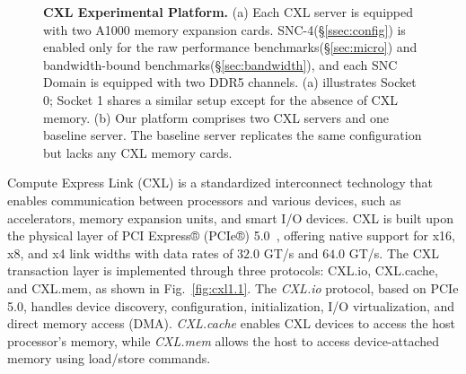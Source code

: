 \begin{figure}[t]
    \centering
    \caption[CXL Experimental Platform]{\textbf{CXL Experimental Platform.} (a) Each CXL server is equipped with two A1000 memory expansion cards. SNC-4(\S\ref{ssec:config}) is enabled only for the raw performance benchmarks(\S\ref{sec:micro}) and bandwidth-bound benchmarks(\S\ref{sec:bandwidth}), and each SNC Domain is equipped with two DDR5 channels. (a) illustrates Socket 0; Socket 1 shares a similar setup except for the absence of CXL memory. (b) Our platform comprises two CXL servers and one baseline server. The baseline server replicates the same configuration but lacks any CXL memory cards.}
\end{figure}

Compute Express Link (CXL) is a standardized interconnect technology that enables communication between processors and various devices, such as accelerators, memory expansion units, and smart I/O devices. CXL is built upon the physical layer of PCI Express® (PCIe®) 5.0~\cite{pcie5.0}, offering native support for x16, x8, and x4 link widths with data rates of $32.0$ GT/s and $64.0$ GT/s. The CXL transaction layer is implemented through three protocols: CXL.io, CXL.cache, and CXL.mem, as shown in Fig.~\ref{fig:cxl1.1}. The \textit{CXL.io} protocol, based on PCIe 5.0, handles device discovery, configuration, initialization, I/O virtualization, and direct memory access (DMA). \textit{CXL.cache} enables CXL devices to access the host processor's memory, while \textit{CXL.mem} allows the host to access device-attached memory using load/store commands.

